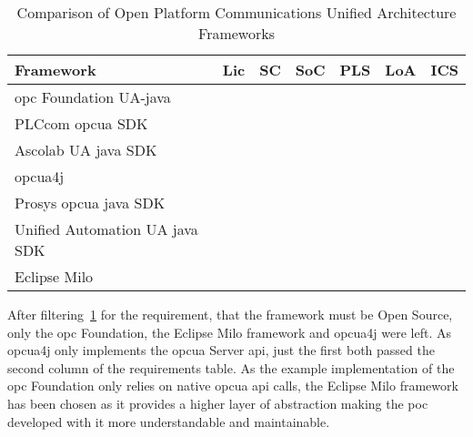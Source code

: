 \documentclass[
a4paper,
twoside,
headsepline,
cleardoublepage=empty,
parskip=half,
draft=false
]{scrbook}
\begin{document}
			\begin{table}[!h]
				\centering
				\caption{Comparison of Open Platform Communications Unified Architecture Frameworks}
				\label{tab:framework_comparison}
				\begin{tabular}{l c c c c c c}
					\toprule
					Framework & Lic & SC & SoC & PLS & LoA & ICS
					\\ \midrule
					\gls{opc} Foundation UA-\gls{java} & \harveyBallFull & \harveyBallFull & \harveyBallNone & \harveyBallQuarter & \harveyBallQuarter & \harveyBallFull
					\\ \midrule
					PLCcom \gls{opcua} SDK & \harveyBallNone & \harveyBallFull & \harveyBallFull & \harveyBallHalf & \harveyBallFull & \harveyBallFull
					\\ \midrule
					Ascolab UA \gls{java} SDK & \harveyBallNone & \harveyBallFull & \harveyBallNone & \harveyBallThreeQuarter & \harveyBallFull & \harveyBallHalf
					\\ \midrule
					opcua4j & \harveyBallFull & \harveyBallHalf & \harveyBallNone & \harveyBallQuarter & \harveyBallQuarter & \harveyBallQuarter
					\\ \midrule
					Prosys \gls{opcua} \gls{java} SDK & \harveyBallNone & \harveyBallFull & \harveyBallFull & \harveyBallQuarter & \harveyBallFull & \harveyBallHalf
					\\ \midrule
					Unified Automation UA \gls{java} SDK & \harveyBallNone & \harveyBallFull & \harveyBallFull & \harveyBallThreeQuarter & \harveyBallFull & \harveyBallHalf
					\\ \midrule
					Eclipse Milo & \harveyBallFull & \harveyBallFull & \harveyBallFull & \harveyBallQuarter & \harveyBallFull & \harveyBallFull
					\\ \bottomrule
				\end{tabular}
			\end{table}
		
			After filtering~\cref{tab:framework_comparison} for the requirement, that the framework must be Open Source, only the \gls{opc} Foundation, the Eclipse Milo framework and opcua4j were left. As opcua4j only implements the \gls{opcua} Server \gls{api}, just the first both passed the second column of the requirements table. As the example implementation of the \gls{opc} Foundation only relies on native \gls{opcua} \gls{api} calls, the Eclipse Milo framework has been chosen as it provides a higher layer of abstraction making the \gls{poc} developed with it more understandable and maintainable.
			
\end{document}
